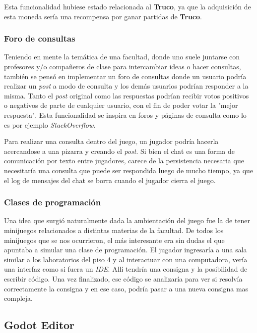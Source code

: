 Esta funcionalidad hubiese estado relacionada al \textbf{Truco}, ya que la adquisición de esta moneda
sería una recompensa por ganar partidas de \textbf{Truco}.

\subsubsection{Foro de consultas}
Teniendo en mente la temática de una facultad, donde uno suele juntarse con profesores y/o compañeros de clase
para intercambiar ideas o hacer consultas, también se pensó en implementar un foro de consultas donde un usuario
podría realizar un \textit{post} a modo de consulta y los demás usuarios podrían responder a la misma. Tanto el \textit{post}
original como las respuestas podrían recibir votos positivos o negativos de parte de cualquier usuario, con el fin
de poder votar la "mejor respuesta". Esta funcionalidad se inspira en foros y páginas de consulta como lo es por ejemplo
\textit{StackOverflow}.

Para realizar una consulta dentro del juego, un jugador podría hacerla acercandose a una pizarra y creando el \textit{post}.
Si bien el chat es una forma de comunicación por texto entre jugadores, carece de la persistencia necesaria que necesitaría
una consulta que puede ser respondida luego de mucho tiempo, ya que el log de mensajes del chat se borra cuando el jugador
cierra el juego.

\subsubsection{Clases de programación}
Una idea que surgió naturalmente dada la ambientación del juego fue la de tener minijuegos relacionados a distintas materias
de la facultad. De todos los minijuegos que se nos ocurrieron, el más interesante era sin dudas el que apuntaba a simular
una clase de programación. El jugador ingresaría a una sala similar a los laboratorios del piso 4 y al interactuar con una
computadora, vería una interfaz como si fuera un \textit{IDE}. Allí tendría una consigna y la posibilidad de escribir código.
Una vez finalizado, ese código se analizaría para ver si resolvía correctamente la consigna y en ese caso, podría pasar a una nueva
consigna mas compleja.

\subsection{Godot Editor}

